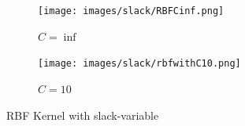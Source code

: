 \documentclass{article}
\begin{document}
\begin{figure}[!h]
    \centering
 \begin{subfigure}[b]{0.35\textwidth}
        \texttt{[image: images/slack/RBFCinf.png]}
        \caption{$C = \inf$}  \label{slack_rbf_figure_1}
    \end{subfigure}
    \begin{subfigure}[b]{0.35\textwidth}
        \texttt{[image: images/slack/rbfwithC10.png]}
        \caption{$C = 10$}  \label{slack_rbf_figure_2}
    \end{subfigure}
	\caption{RBF Kernel with slack-variable}
    \label{RBF_slack}
\end{figure}
\end{document}
